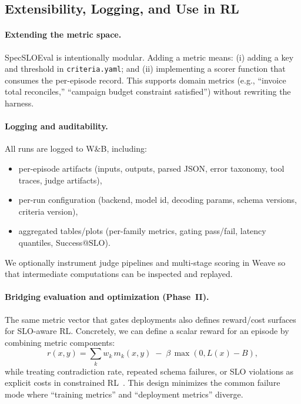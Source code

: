 \documentclass[11pt]{article}
\newcommand{\slo}{\ensuremath{\mathrm{SLO}}}
\begin{document}
\subsection{Extensibility, Logging, and Use in RL}
\label{sec:extensibility-rl}

\paragraph{Extending the metric space.}
SpecSLOEval is intentionally modular.
Adding a metric means:
(i) adding a key and threshold in \texttt{criteria.yaml}; and
(ii) implementing a scorer function that consumes the per-episode record.
This supports domain metrics (e.g., “invoice total reconciles,” “campaign budget constraint satisfied”) without rewriting the harness.

\paragraph{Logging and auditability.}
All runs are logged to W\&B, including:
\begin{itemize}[leftmargin=12pt]
    \item per-episode artifacts (inputs, outputs, parsed JSON, error taxonomy, tool traces, judge artifacts),
    \item per-run configuration (backend, model id, decoding params, schema versions, criteria version),
    \item aggregated tables/plots (per-family metrics, gating pass/fail, latency quantiles, Success@\slo).
\end{itemize}
We optionally instrument judge pipelines and multi-stage scoring in Weave so that intermediate computations can be inspected and replayed.

\paragraph{Bridging evaluation and optimization (Phase~II).}
The same metric vector that gates deployments also defines reward/cost surfaces for SLO-aware RL.
Concretely, we can define a scalar reward for an episode by combining metric components:
\[
r(x,y) = \sum_{k} w_k\, m_k(x,y) \;-\; \beta\,\max(0, L(x)-B),
\]
while treating contradiction rate, repeated schema failures, or SLO violations as explicit costs in constrained RL~\citep{altman1999cmdp,achiam2017cpo}.
This design minimizes the common failure mode where “training metrics” and “deployment metrics” diverge.
\end{document}
